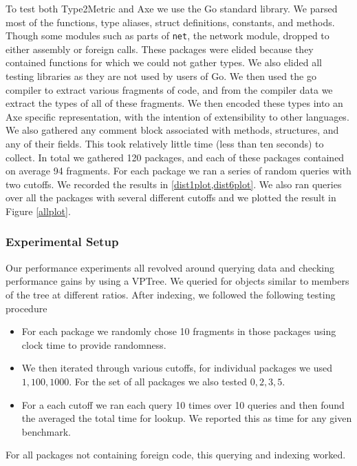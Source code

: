 To test both Type2Metric and Axe we use the Go standard library.
We parsed most of the functions, type aliases, struct definitions, constants, and methods.
Though some modules such as parts of \texttt{net}, the network module,
dropped to either assembly or foreign calls.
These packages were elided because they contained functions for which we could not gather types.
We also elided all testing libraries as they are not used by users of Go.
We then used the go compiler to extract various fragments of code,
and from the compiler data we extract the types of all of these fragments.
We then encoded these types into an Axe specific representation,
with the intention of extensibility to other languages.
We also gathered any comment block associated with methods, structures, and any of their fields.
This took relatively little time (less than ten seconds) to collect.
In total we gathered 120 packages, 
and each of these packages contained on average 94 fragments.
For each package we ran a series of random queries with two cutoffs.
We recorded the results in \ref{dist1plot,dist6plot}.
We also ran queries over all the packages with several different cutoffs
and we plotted the result in Figure \ref{allplot}.

\subsubsection{Experimental Setup}
Our performance 
experiments all revolved around querying data and checking performance gains
by using a VPTree.
We queried for objects similar to members of the tree at different ratios.
After indexing, we followed the following testing procedure
\begin{itemize}
    \item 
    For each package we randomly chose 10 fragments in those packages 
    using clock time to provide randomness.
    \item 
    We then iterated through various cutoffs, for individual packages we 
    used $1, 100, 1000$. 
    For the set of all packages we also tested $0,2,3,5$.
    \item 
    For a each cutoff we ran each query 10 times over 10 queries 
    and then found the averaged the total time for lookup.
    We reported this as time for any given benchmark.
\end{itemize}
For all packages not containing foreign code,
this querying and indexing worked.